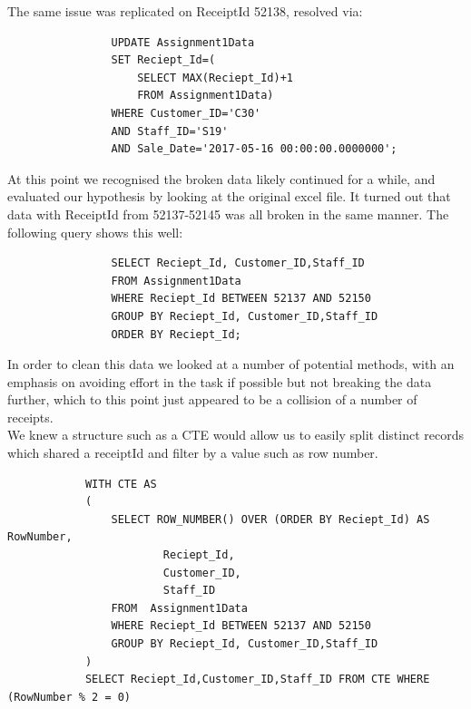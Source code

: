 \documentclass{article}
\begin{document}
            The same issue was replicated on ReceiptId 52138, resolved via:

            \begin{lstlisting}
                UPDATE Assignment1Data 
                SET Reciept_Id=(
                    SELECT MAX(Reciept_Id)+1 
                    FROM Assignment1Data) 
                WHERE Customer_ID='C30' 
                AND Staff_ID='S19' 
                AND Sale_Date='2017-05-16 00:00:00.0000000';
            \end{lstlisting}

            At this point we recognised the broken data likely continued for a while, and 
            evaluated our hypothesis by looking at the original excel file. It turned
            out that data with ReceiptId from 52137-52145 was all broken in the same manner.
            The following query shows this well:

            \begin{lstlisting}
                SELECT Reciept_Id, Customer_ID,Staff_ID 
                FROM Assignment1Data 
                WHERE Reciept_Id BETWEEN 52137 AND 52150
                GROUP BY Reciept_Id, Customer_ID,Staff_ID 
                ORDER BY Reciept_Id;
            \end{lstlisting}

            \newpage

            In order to clean this data we looked at a number of potential methods, with an 
            emphasis on avoiding effort in the task if possible but not breaking the data further,
            which to this point just appeared to be a collision of a number of receipts.
            \\
            We knew a structure such as a CTE\cite{CTE} would allow us to easily split
            distinct records which shared a receiptId and filter by a value such as row number.

            \begin{lstlisting}
            WITH CTE AS
            (
                SELECT ROW_NUMBER() OVER (ORDER BY Reciept_Id) AS RowNumber,
                        Reciept_Id,
                        Customer_ID,
                        Staff_ID
                FROM  Assignment1Data
                WHERE Reciept_Id BETWEEN 52137 AND 52150
                GROUP BY Reciept_Id, Customer_ID,Staff_ID 
            )
            SELECT Reciept_Id,Customer_ID,Staff_ID FROM CTE WHERE (RowNumber % 2 = 0)
            \end{lstlisting}
\end{document}
